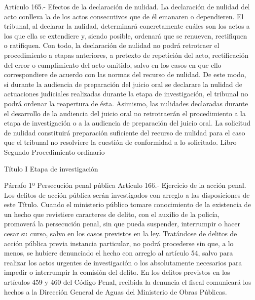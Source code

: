     Artículo 165.- Efectos de la declaración de nulidad. La declaración de nulidad del acto conlleva la de los actos consecutivos que de él emanaren o dependieren.
    El tribunal, al declarar la nulidad, determinará concretamente cuáles son los actos a los que ella se extendiere y, siendo posible, ordenará que se renueven, rectifiquen o ratifiquen.
    Con todo, la declaración de nulidad no podrá retrotraer el procedimiento a etapas anteriores, a pretexto de repetición del acto, rectificación del error o cumplimiento del acto omitido, salvo en los casos en que ello correspondiere de acuerdo con las normas del recurso de nulidad. De este modo, si durante la audiencia de preparación del juicio oral se declarare la nulidad de actuaciones judiciales realizadas durante la etapa de investigación, el tribunal no podrá ordenar la reapertura de ésta. Asimismo, las nulidades declaradas durante el desarrollo de la audiencia del juicio oral no retrotraerán el procedimiento a la etapa de investigación o a la audiencia de preparación del juicio oral.
    La solicitud de nulidad constituirá preparación suficiente del recurso de nulidad para el caso que el tribunal no resolviere la cuestión de conformidad a lo solicitado.
    Libro Segundo
    Procedimiento ordinario

    Título I
    Etapa de investigación

    Párrafo 1º Persecución penal pública
    Artículo 166.- Ejercicio de la acción penal. Los delitos de acción pública serán investigados con arreglo a las disposiciones de este Título.
    Cuando el ministerio público tomare conocimiento de la existencia de un hecho que revistiere caracteres de delito, con el auxilio de la policía, promoverá la persecución penal, sin que pueda suspender, interrumpir o hacer cesar su curso, salvo en los casos previstos en la ley.
    Tratándose de delitos de acción pública previa instancia particular, no podrá procederse sin que, a lo menos, se hubiere denunciado el hecho con arreglo al artículo 54, salvo para realizar los actos urgentes de investigación o los absolutamente necesarios para impedir o interrumpir la comisión del delito.
    En los delitos previstos en los artículos 459 y 460 del Código Penal, recibida la denuncia el fiscal comunicará los hechos a la Dirección General de Aguas del Ministerio de Obras Públicas.

